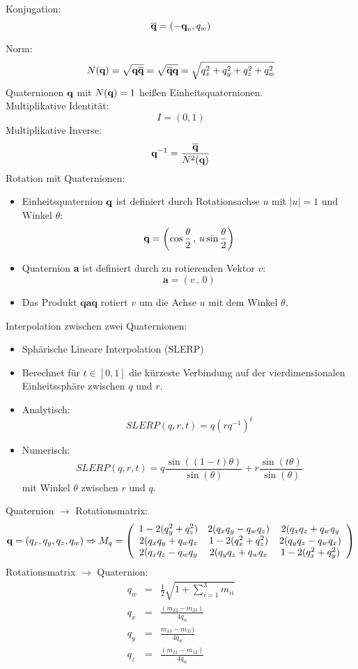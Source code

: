 Konjugation: \[ \overline{\textbf{q}} = (-\textbf{q}_v, q_w)\]

Norm: $$N(\textbf{q}) = \sqrt{\textbf{q} \overline{\textbf{q}}} = \sqrt{\overline{\textbf{q}}\textbf{q}} = \sqrt{q_x^2 + q_y^2 + q_z^2 + q_w^2}$$
Quaternionen $\textbf{q}$ mit $N(\textbf{q}) = 1$ heißen Einheitsquaternionen. \\ Multiplikative Identität: $$I = (0,1)$$ Multiplikative Inverse: $$\textbf{q}^{-1} = \frac{\overline{\textbf{q}}}{N^2(\textbf{q})}$$
Rotation mit Quaternionen:
\begin{itemize}
\item Einheitsquaternion $\textbf{q}$ ist definiert durch Rotationsachse $u$ mit $|u| = 1$ und Winkel $\theta$: $$\textbf{q} = \left( \cos \frac{\theta}{2} \, , \, u \sin \frac{\theta}{2} \right)$$
\item Quaternion \textbf{a} ist definiert durch zu rotierenden Vektor $v$: $$\textbf{a} = (v \, , \, 0)$$
\item Das Produkt $\textbf{qa}\overline{\textbf{q}}$ rotiert $v$ um die Achse $u$ mit dem Winkel $\theta$.
\end{itemize}
Interpolation zwischen zwei Quaternionen:
\begin{itemize}
\item Sphärische Lineare Interpolation (SLERP)
\item Berechnet für $t \in [0,1]$ die kürzeste Verbindung auf der vierdimensionalen Einheitssphäre zwischen $q$ und $r$.
\item Analytisch: $$SLERP(q,r,t) = q(rq^{-1})^t$$
\item Numerisch: $$SLERP(q,r,t) = q \frac{\sin((1-t)\theta)}{\sin(\theta)} + r \frac{\sin(t \theta)}{\sin(\theta)}$$ mit Winkel $\theta$ zwischen $r$ und $q$.
\end{itemize}
Quaternion $\to$ Rotationsmatrix: $$\textbf{q} = (q_x,q_y,q_z,q_w) \Rightarrow M_q = \left( \begin{array}{ccc} 1-2(q_y^2 + q_z^2) & 2(q_xq_y - q_wq_z) & 2(q_xq_z + q_wq_y \\ 2(q_xq_y + q_wq_z & 1-2(q_x^2 + q_z^2) & 2(q_yq_z - q_wq_x) \\ 2(q_xq_z - q_wq_y & 2(q_yq_z + q_wq_x & 1-2(q_x^2 + q_y^2) \end{array} \right)$$
Rotationsmatrix $\to$ Quaternion:
\begin{eqnarray*}
q_w &=& \frac{1}{2} \sqrt{1 + \sum\limits_{i=1}^3 m_{ii}} \\ q_x &=& \frac{(m_{32} - m_{23})}{4q_w} \\ q_y &=& \frac{m_{13} - m_{31})}{4q_w} \\ q_z &=& \frac{(m_{21} - m_{12})}{4q_w}
\end{eqnarray*}

